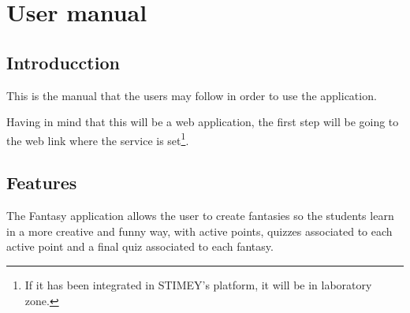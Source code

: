 \documentclass{book}
\newenvironment{changemargin}[2]{%
	\begin{list}{}{%
			\setlength{\topsep}{0pt}%
			\setlength{\leftmargin}{#1}%
			\setlength{\rightmargin}{#2}%
			\setlength{\listparindent}{\parindent}%
			\setlength{\itemindent}{\parindent}%
			\setlength{\parsep}{\parskip}%
		}%
		\item[]}{\end{list}}
\begin{document}
%
%
%	
%		
%		
%		
%		
%		
%		
%
%	
%
%
%	
%	
%

\newpage

%


\tableofcontents
\newpage
	
\chapter{User manual}
\section{Introducction}
This is the manual that the users may follow in order to use the application.


Having in mind that this will be a web application, the first step will be going to the web link where the service is set\footnote{If it has been integrated in STIMEY's platform, it will be in laboratory zone.}.


\section{Features}
The Fantasy application allows the user to create fantasies so the students learn in a more creative and funny way, with active points, quizzes associated to each active point and a final quiz associated to each fantasy.
\end{document}

